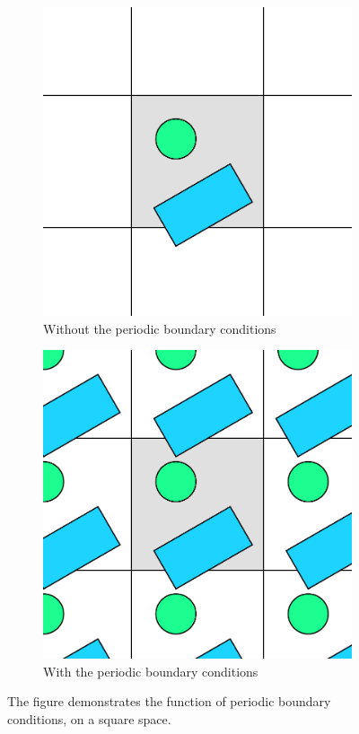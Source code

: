 \documentclass[12pt, oneside]{report}
\begin{document}
\begin{figure}[H]
  \centering

  \begin{subfigure}[b]{0.4\linewidth}
    \includegraphics[width=\linewidth,height=\linewidth]{Images/CieslaAlgorithm/pec1.pdf}
    \caption{Without the periodic boundary conditions}
  \end{subfigure}
  \begin{subfigure}[b]{0.4\linewidth}
    \includegraphics[width=\linewidth,height=\linewidth]{Images/CieslaAlgorithm/pec2.pdf}
    \caption{With the periodic boundary conditions}
  \end{subfigure}

\caption{The figure demonstrates the function of periodic boundary conditions, on a square space.}
\end{figure}
\end{document}
